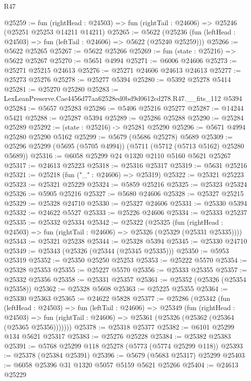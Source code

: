 \begin{lexlean}{R47}
\begin{coremodule}
@25259 := fun (rightHead : @24503) =>
  fun (rightTail : @24606) => @25246 (@25251 @25253 @14211 @14211)
@25265 := @5622
    (@25236 (fun (leftHead : @24503) => fun (leftTail : @24606) => @5622 (@25240 @25259)))
@25266 := @5622 @25265
@25267 := @5622 @25266
@25269 := fun (state : @25216) => @5622 @25267
@25270 := @5651 @4994
@25271 := @6006 @24606
@25273 := @25271 @25215 @24613
@25276 := @25271 @24606 @24613 @24613
@25277 := @25273 @25276
@25278 := @25277 @5394
@25280 := @5392 @25278 @5414
@25281 := @25270 @25280
@25283 := LexLeanPreserve.Cae4456d77aa62528ed0bd9d0612cd278.R47.__fits_112 @5394
@25284 := @5657 @25283
@25286 := @5406 @25216 @25277
@25287 := @14244 @5421
@25288 := @25287 @5394
@25289 := @25286 @25288
@25290 := @25284 @25289
@25292 := (state : @25216) -> @25281 @25290
@25296 := @5671 @4994 @25280 @25290 @5162
@25299 := @5679 (@5686 @25278) @5689
@25309 := @25296 @25299 (@5695 (@5705 @4994)) (@5711 (@5712 (@5713 @5162) @25280 @5689))
@25316 := @6058 @25299 @24 @1320 @2110 @5160 @5621 @25267
@25317 := @24613 @25223
@25318 := @25316 @25317
@25319 := @5631 @25216
@25321 := @25218 (fun ("_" : @24606) => @25319)
@25322 := @25321 @25223
@25323 := @25321 @25229
@25324 := @5859 @25216
@25325 := @25323 @25324
@25326 := @5905 @25216
@25327 := @5680 @24606
@25328 := @25327 @25215
@25329 := @25328 @24710
@25330 := @25327 @24606
@25331 := @25330 @5394
@25332 := @24622 @5527
@25333 := @25226 @24606
@25334 := @25333 @25237
@25335 := @25332 @25334
@25342 := @25322
    (@25325
      (fun (rightHead : @24503) => fun (rightTail : @24606) => @25326 (@25329 (@25331 @25335))))
@25343 := @25321 @25238
@25344 := @25328 @5394
@25345 := @25330 @24710
@25349 := @25343 (@25326 (@25344 (@25345 @25335)))
@25350 := @5953 @25319
@25352 := @25350 @25250 @25253
@25353 := @25222 @5570
@25354 := @25328 @25353
@25355 := @25227 @5570
@25356 := @25333 @25355
@25357 := @25332 @25356
@25358 := @25331 @25357
@25361 := @25352 (@25326 (@25354 @25358))
@25362 := @25328 @5608
@25363 := @25225 @25355
@25364 := @25330 @25363
@25365 := @24622 @5828
@25377 := @25286
    (@25342
      (fun (leftHead : @24503) =>
      fun (leftTail : @24606) =>
      @25349
        (fun (rightHead : @24503) =>
        fun (rightTail : @24606) => @25361 (@25326 (@25362 (@25364 (@25365 @25356)))))))
@25378 := @25318 @25377
@25382 := @6101 @25299 @134 @5621 @25317
@25383 := @25276 @25228
@25384 := @25382 @25383
@25391 := @5768 @25299 @118 @25278 (@5773 (@5774 @25299 @118))
@25393 := @25378 (@25384 @25391)
@25396 := @5679 (@5683 @25317) @25299
@25403 := @6058 @25396 @31 @1320 @5057 @5159 @5621 @25266
@25404 := @24613 @25229

\end{coremodule}
\end{lexlean}
